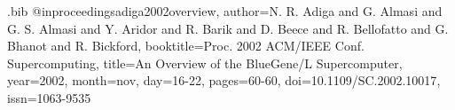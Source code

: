 \RequirePackage{filecontents}
\begin{filecontents*}{\jobname.bib}
@inproceedings{adiga2002overview,
  author={N. R. Adiga and G. Almasi and G. S. Almasi and Y. Aridor 
    and R. Barik and D. Beece and R. Bellofatto and G. Bhanot 
    and R. Bickford},
  booktitle={Proc. 2002 ACM/IEEE Conf. Supercomputing},
  title={{An Overview of the BlueGene/L Supercomputer}},
  year={2002},
  month=nov,
  day={16-22},
  pages={60-60},
  doi={10.1109/SC.2002.10017},
  issn={1063-9535}
}

\end{filecontents*}

\documentclass[12pt]{thesis}
\usepackage[utf8]{inputenc}



Here is a citation~\cite{adiga2002overview}.




